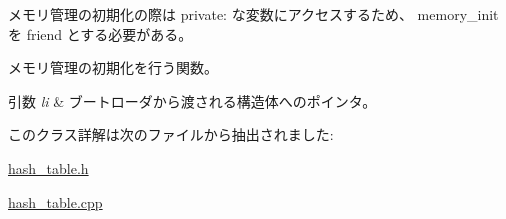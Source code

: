 メモリ管理の初期化の際は private\+: な変数にアクセスするため、 memory\+\_\+init を friend とする必要がある。

メモリ管理の初期化を行う関数。 
\begin{DoxyParams}{引数}
{\em li} & ブートローダから渡される構造体へのポインタ。 \\
\hline
\end{DoxyParams}


このクラス詳解は次のファイルから抽出されました\+:\begin{DoxyCompactItemize}
\item 
\hyperlink{hash__table_8h}{hash\+\_\+table.\+h}\item 
\hyperlink{hash__table_8cpp}{hash\+\_\+table.\+cpp}\end{DoxyCompactItemize}

